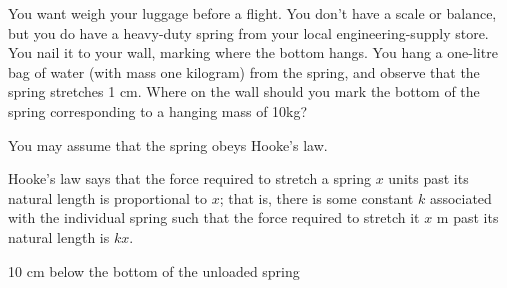 \begin{question}
You want weigh your luggage  before a flight. You don't have a scale or balance, but you do have a heavy-duty spring from your local engineering-supply store. You nail it to your wall, marking where the bottom hangs. You hang a one-litre bag of water (with mass one kilogram)  from the spring, and observe that the spring stretches 1 cm. Where on the wall should you mark the bottom of the spring corresponding to a hanging mass of 10kg?

\begin{center}
\end{center}

You may assume that the spring obeys Hooke's law.
\end{question}
\begin{hint}
Hooke's law says that the force required to stretch a spring $x$ units past its natural length is proportional to $x$; that is, there is some constant $k$ associated with the individual spring such that the force required to stretch it $x$ m past its natural length is $kx$.
\end{hint}
\begin{answer}
10 cm below the bottom of the unloaded spring
\end{answer}
